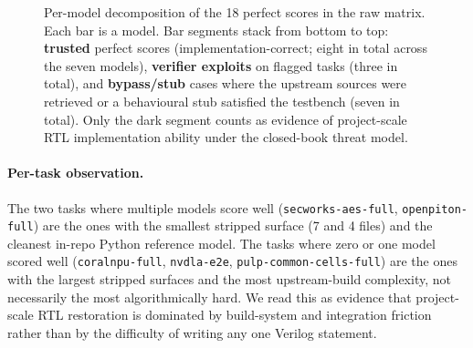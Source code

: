 \documentclass{article}
\begin{document}
\begin{figure}[H]
\centering
{}
\caption{Per-model decomposition of the 18 perfect scores in the raw matrix. Each bar is a
model. Bar segments stack from bottom to top: \textbf{trusted} perfect scores
(implementation-correct; eight in total across the seven models), \textbf{verifier
exploits} on flagged tasks (three in total), and \textbf{bypass/stub} cases where the
upstream sources were retrieved or a behavioural stub satisfied the testbench (seven in
total). Only the dark segment counts as evidence of project-scale RTL implementation
ability under the closed-book threat model.}
\label{fig:headline}
\end{figure}

\paragraph{Per-task observation.}
The two tasks where multiple models score well (\texttt{secworks-aes-full},
\texttt{openpiton-full}) are the ones with the smallest stripped surface (7 and 4 files) and
the cleanest in-repo Python reference model. The tasks where zero or one model scored well
(\texttt{coralnpu-full}, \texttt{nvdla-e2e}, \texttt{pulp-common-cells-full}) are the ones
with the largest stripped surfaces and the most upstream-build complexity, not necessarily
the most algorithmically hard. We read this as evidence that project-scale RTL restoration is
dominated by build-system and integration friction rather than by the difficulty of writing
any one Verilog statement.
\end{document}
